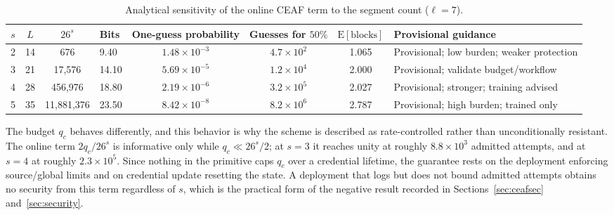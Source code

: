 \documentclass[cmc,article,submit,moreauthors,pdftex]{Definitions/tsp}
\renewcommand{\mathbb}[1]{\mathrm{#1}}
\begin{document}
\begin{table}[t]
\caption{Analytical sensitivity of the online CEAF term to the segment count ($\ell=7$).}
\label{tab:sens}
\begin{tabularx}{\textwidth}{cccXccc>{\raggedright\arraybackslash}X}
\toprule
\boldmath$s$ & \boldmath$L$ & \boldmath$26^{s}$ & \textbf{Bits} & \textbf{One-guess probability} & \textbf{Guesses for $50\%$} & \boldmath$\mathbb{E}[\text{blocks}]$ & \textbf{Provisional guidance}\\
\midrule
2 & 14 & 676 & 9.40 & $1.48\times10^{-3}$ & $4.7\times10^{2}$ & 1.065 & Provisional; low burden; weaker protection\\
3 & 21 & 17{,}576 & 14.10 & $5.69\times10^{-5}$ & $1.2\times10^{4}$ & 2.000 & Provisional; validate budget/workflow\\
4 & 28 & 456{,}976 & 18.80 & $2.19\times10^{-6}$ & $3.2\times10^{5}$ & 2.027 & Provisional; stronger; training advised\\
5 & 35 & 11{,}881{,}376 & 23.50 & $8.42\times10^{-8}$ & $8.2\times10^{6}$ & 2.787 & Provisional; high burden; trained only\\
\bottomrule
\end{tabularx}
\end{table}

The budget $q_{c}$ behaves differently, and this behavior is why the scheme is described as rate-controlled rather than unconditionally resistant. The online term $2q_{c}/26^{s}$ is informative only while $q_{c}\ll26^{s}/2$; at $s=3$ it reaches unity at roughly $8.8\times10^{3}$ admitted attempts, and at $s=4$ at roughly $2.3\times10^{5}$. Since nothing in the primitive caps $q_{c}$ over a credential lifetime, the guarantee rests on the deployment enforcing source/global limits and on credential update resetting the state. A deployment that logs but does not bound admitted attempts obtains no security from this term regardless of $s$, which is the practical form of the negative result recorded in Sections~\ref{sec:ceafsec} and~\ref{sec:security}.
\end{document}

